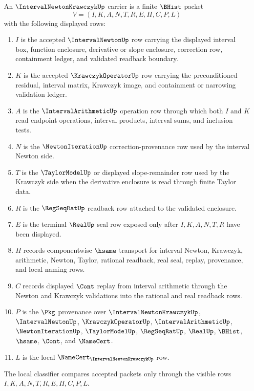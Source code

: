 \begin{definition}
\label{def:interval-newton-krawczyk-carrier}
An $\IntervalNewtonKrawczykUp$ carrier is a finite $\BHist$ packet
$$
V=(I,K,A,N,T,R,E,H,C,P,L)
$$
with the following displayed rows:
\begin{enumerate}
\item $I$ is the accepted $\IntervalNewtonUp$ row carrying the displayed interval box, function enclosure, derivative or slope enclosure, correction row, containment ledger, and validated readback boundary.
\item $K$ is the accepted $\KrawczykOperatorUp$ row carrying the preconditioned residual, interval matrix, Krawczyk image, and containment or narrowing validation ledger.
\item $A$ is the $\IntervalArithmeticUp$ operation row through which both $I$ and $K$ read endpoint operations, interval products, interval sums, and inclusion tests.
\item $N$ is the $\NewtonIterationUp$ correction-provenance row used by the interval Newton side.
\item $T$ is the $\TaylorModelUp$ or displayed slope-remainder row used by the Krawczyk side when the derivative enclosure is read through finite Taylor data.
\item $R$ is the $\RegSeqRatUp$ readback row attached to the validated enclosure.
\item $E$ is the terminal $\RealUp$ seal row exposed only after $I,K,A,N,T,R$ have been displayed.
\item $H$ records componentwise $\hsame$ transport for interval Newton, Krawczyk, arithmetic, Newton, Taylor, rational readback, real seal, replay, provenance, and local naming rows.
\item $C$ records displayed $\Cont$ replay from interval arithmetic through the Newton and Krawczyk validations into the rational and real readback rows.
\item $P$ is the $\Pkg$ provenance over $\IntervalNewtonKrawczykUp$, $\IntervalNewtonUp$, $\KrawczykOperatorUp$, $\IntervalArithmeticUp$, $\NewtonIterationUp$, $\TaylorModelUp$, $\RegSeqRatUp$, $\RealUp$, $\BHist$, $\hsame$, $\Cont$, and $\NameCert$.
\item $L$ is the local $\NameCert_{\IntervalNewtonKrawczykUp}$ row.
\end{enumerate}
The local classifier compares accepted packets only through the visible rows $I,K,A,N,T,R,E,H,C,P,L$.
\end{definition}

